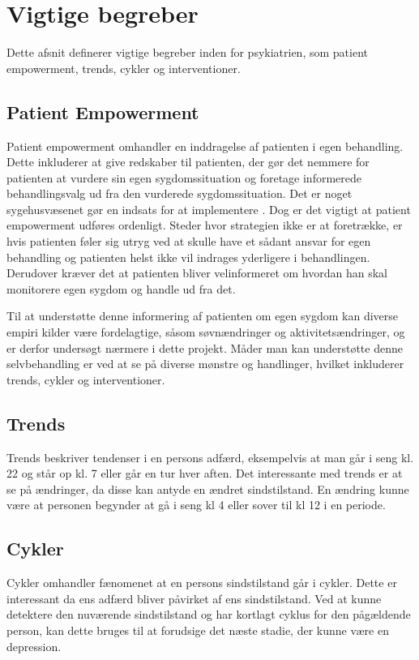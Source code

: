 \section{Vigtige begreber}
Dette afsnit definerer vigtige begreber inden for psykiatrien, som patient empowerment, trends, cykler og interventioner.

\subsection{Patient Empowerment}\label{sec:patientempowerment}
Patient empowerment omhandler en inddragelse af patienten i egen behandling.
Dette inkluderer at give redskaber til patienten, der gør det nemmere for patienten at vurdere sin egen sygdomssituation og foretage informerede behandlingsvalg ud fra den vurderede sygdomssituation.
Det er noget sygehusvæsenet gør en indsats for at implementere \citep{misc:patientpowerhovedstaden}.
Dog er det vigtigt at patient empowerment udføres ordenligt.
Steder hvor strategien ikke er at foretrække, er hvis patienten føler sig utryg ved at skulle have et sådant ansvar for egen behandling og patienten helst ikke vil indrages yderligere i behandlingen.
Derudover kræver det at patienten bliver velinformeret om hvordan han skal monitorere egen sygdom og handle ud fra det.

Til at understøtte denne informering af patienten om egen sygdom kan diverse empiri kilder være fordelagtige, såsom søvnændringer og aktivitetsændringer\citep{misc:jorgen-aagaard}, og er derfor undersøgt nærmere i dette projekt.
Måder man kan understøtte denne selvbehandling er ved at se på diverse mønstre og handlinger, hvilket inkluderer trends, cykler og interventioner.

\subsection{Trends}
Trends beskriver tendenser i en persons adfærd, eksempelvis at man går i seng kl. 22 og står op kl. 7 eller går en tur hver aften.
Det interessante med trends er at se på ændringer, da disse kan antyde en ændret sindstilstand.
En ændring kunne være at personen begynder at gå i seng kl 4 eller sover til kl 12 i en periode.

\subsection{Cykler}
Cykler omhandler fænomenet at en persons sindstilstand går i cykler.
Dette er interessant da ens adfærd bliver påvirket af ens sindstilstand.
Ved at kunne detektere den nuværende sindstilstand og har kortlagt cyklus for den pågældende person, kan dette bruges til at forudsige det næste stadie, der kunne være en depression.

